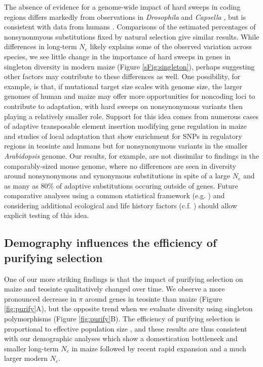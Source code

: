 \documentclass[twoside, twocolumn, letterpaper]{article}
\begin{document}
The absence of evidence for a genome-wide impact of hard sweeps in coding regions differs markedly from observations in \emph{Drosophila} \cite{sattath2011} and \emph{Capsella} \cite{williamson2014}, but is consistent with data from humans \cite{hernandez2011,pritchard2010genetics}.
Comparisons of the estimated percentages of nonsynonmyous substitutions fixed by natural selection \cite{ross2009,sella2009,eyre2009estimating,williamson2014} give similar results. 
While differences in long-term $N_e$ likely explains some of the observed variation across species, we see little change in the importance of hard sweeps in genes in singleton diversity in modern maize (Figure \ref{sFig:singleton}), perhaps suggesting other factors may contribute to these differences as well.  
One possibility, for example, is that, if mutational target size scales with genome size, the larger genomes of human and maize may offer more opportunities for noncoding loci to contribute to adaptation, with hard sweeps on nonsynonymous variants then playing a relatively smaller role. 
Support for this idea comes from numerous cases of adaptive transposable element insertion modifying gene regulation in maize \cite{studer2011,castelletti2014mite,mao2015,yang2013} and studies of local adaptation that show enrichment for SNPs in regulatory regions in teosinte \cite{pyhajarvi2013} and humans \cite{fraser2013gene} but for nonsynonymous variants in the smaller \emph{Arabidopsis} genome.  
Our results, for example, are not dissimilar to findings in the comparably-sized mouse genome, where no differences are seen in diversity around nonsynonymous and synonymous substitutions in spite of a large $N_e$ and  as many as 80\% of adaptive substitutions occuring outside of genes\cite{Halligan:2013ir}.
Future comparative analyses using a common statistical framework (e.g. \cite{corbett2015}) and considering additional ecological and life history factors (c.f. \cite{leffler2012}) should allow explicit testing of this idea.

\subsection*{Demography influences the efficiency of purifying selection} %
One of our more striking findings is that the impact of purifying selection on maize and teosinte qualitatively changed over time. 
We observe a more pronounced decrease in $\pi$ around genes in teosinte than maize (Figure \ref{fig:purify}A), but the opposite trend when we evaluate diversity using singleton polymorphisms (Figure \ref{fig:purify}B).
The efficiency of purifying selection is proportional to effective population size \cite{kimura1984}, and these results are thus consistent with our demographic analyses which show a domestication bottleneck and smaller long-term $N_e$ in maize \cite{eyre1998, tenaillon2004, wright2005, ross2009} followed by recent rapid expansion and a much larger modern $N_e$.  
\end{document}
